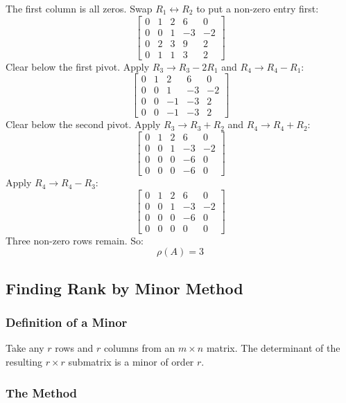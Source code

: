 \documentclass[
]{article}
\begin{document}
The first column is all zeros. Swap \(R_1 \leftrightarrow R_2\) to put a
non-zero entry first:
\[
\begin{bmatrix}
0 & 1 & 2 & 6 & 0 \\
0 & 0 & 1 & -3 & -2 \\
0 & 2 & 3 & 9 & 2 \\
0 & 1 & 1 & 3 & 2
\end{bmatrix}
\]
Clear below the first pivot. Apply \(R_3 \to R_3 - 2R_1\) and
\(R_4 \to R_4 - R_1\):
\[
\begin{bmatrix}
0 & 1 & 2 & 6 & 0 \\
0 & 0 & 1 & -3 & -2 \\
0 & 0 & -1 & -3 & 2 \\
0 & 0 & -1 & -3 & 2
\end{bmatrix}
\]
Clear below the second pivot. Apply \(R_3 \to R_3 + R_2\) and
\(R_4 \to R_4 + R_2\):
\[
\begin{bmatrix}
0 & 1 & 2 & 6 & 0 \\
0 & 0 & 1 & -3 & -2 \\
0 & 0 & 0 & -6 & 0 \\
0 & 0 & 0 & -6 & 0
\end{bmatrix}
\]
Apply \(R_4 \to R_4 - R_3\):
\[
\begin{bmatrix}
0 & 1 & 2 & 6 & 0 \\
0 & 0 & 1 & -3 & -2 \\
0 & 0 & 0 & -6 & 0 \\
0 & 0 & 0 & 0 & 0
\end{bmatrix}
\]
Three non-zero rows remain. So:
\[
\rho(A) = 3
\]

\subsection{Finding Rank by Minor
Method}\label{finding-rank-by-minor-method}

\subsubsection{Definition of a Minor}\label{definition-of-a-minor}

Take any \(r\) rows and \(r\) columns from an \(m \times n\) matrix. The
determinant of the resulting \(r \times r\) submatrix is a minor of
order \(r\).

\subsubsection{The Method}\label{the-method-2}
\end{document}
